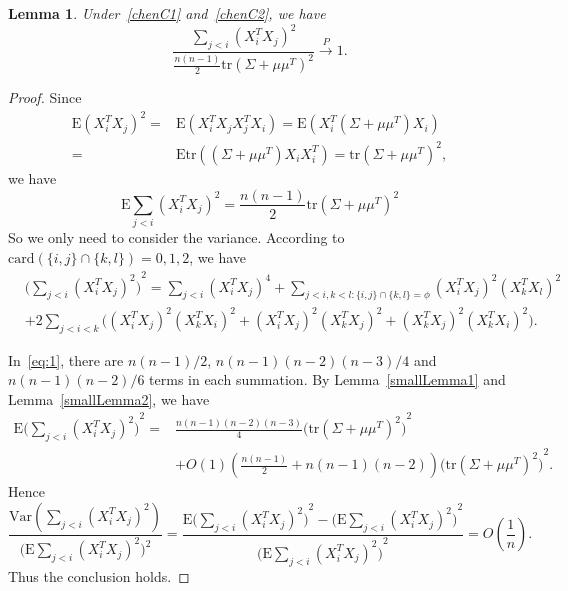 \documentclass[review]{elsarticle}
\theoremstyle{plain}
\newtheorem{lemma}{Lemma}
\theoremstyle{definition}
\theoremstyle{remark}
\begin{document}
\begin{lemma}\label{ratioLemma}
    Under~\eqref{chenC1} and~\eqref{chenC2}, we have
    \begin{equation}
        \frac{\sum_{j<i}{(X_i^T X_j)}^2}{\frac{n(n-1)}{2}\mathrm{tr} (\Sigma+\mu\mu^T)^2}
        \xrightarrow{P}1.
    \end{equation}
\end{lemma}
\begin{proof}
    Since
    \begin{equation}
        \begin{aligned}
            \mathrm{E}{(X_i^T X_j)}^2=&
            \mathrm{E}(X_i^T X_j X_j^T X_i)=
            \mathrm{E}(X_i^T (\Sigma+\mu \mu^T) X_i)\\
            =&
            \mathrm{E}\mathrm{tr}((\Sigma+\mu \mu^T) X_i X_i^T)=\mathrm{tr}{(\Sigma+\mu \mu^T)}^2,
        \end{aligned}
    \end{equation}
   we have 
    \begin{equation}
        \mathrm{E}\sum_{j<i}{(X_i^T X_j)}^2=\frac{n(n-1)}{2}\mathrm{tr}{(\Sigma+\mu\mu^T)}^2
    \end{equation}
    So we only need to consider the variance. According to $\mathrm{card}(\{i,j\}\cap\{k,l\})=0,1,2$, we have
    \begin{equation}\label{eq:1}
    \begin{aligned}
        &{\big(\sum_{j<i}{(X_i^T X_j)}^2\big)}^2
        =
        \sum_{j<i}{(X_i^T X_j)}^4+
        \sum_{j<i,k<l:\{i,j\}\cap \{k,l\}=\phi}{(X_i^T X_j)}^2{(X_k^T X_l)}^2\\
        &+2\sum_{j<i<k}\big(
        {(X_i^T X_j)}^2{(X_k^T X_i)}^2+
{(X_i^T X_j)}^2{(X_k^T X_j)}^2+
{(X_k^T X_j)}^2{(X_k^T X_i)}^2
        \big).
    \end{aligned}
    \end{equation}


   
    In~\eqref{eq:1}, there are $n(n-1)/2$, $n(n-1)(n-2)(n-3)/4$ and $n(n-1)(n-2)/6$ terms in each summation. By Lemma~\ref{smallLemma1} and Lemma~\ref{smallLemma2}, we have
    \begin{equation}
    \begin{aligned}
        \mathrm{E}{\big(\sum_{j<i}{(X_i^T X_j)}^2\big)}^2
            =&\frac{n(n-1)(n-2)(n-3)}{4}{\big(\mathrm{tr}(\Sigma+\mu\mu^T)^2\big)}^2\\
            &+O(1)(\frac{n(n-1)}{2}+n(n-1)(n-2)){\big(\mathrm{tr}(\Sigma+\mu\mu^T)^2\big)}^2.
    \end{aligned}
    \end{equation}
Hence 
    $$
    \frac{
        \mathrm{Var}(\sum_{j<i}{(X_i^T X_j)}^2)
    }{\big(\mathrm{E}\sum_{j<i}{(X_i^T X_j)}^2\big)^2}
    =
    \frac{
        \mathrm{E}{\big(\sum_{j<i}{(X_i^T X_j)}^2\big)}^2-
        {\big(\mathrm{E}\sum_{j<i}{(X_i^T X_j)}^2\big)}^2
    }{
        {\big(\mathrm{E}\sum_{j<i}{(X_i^T X_j)}^2\big)}^2
    }
    =O(\frac{1}{n}).
    $$
    Thus the conclusion holds.
\end{proof}
\end{document}
